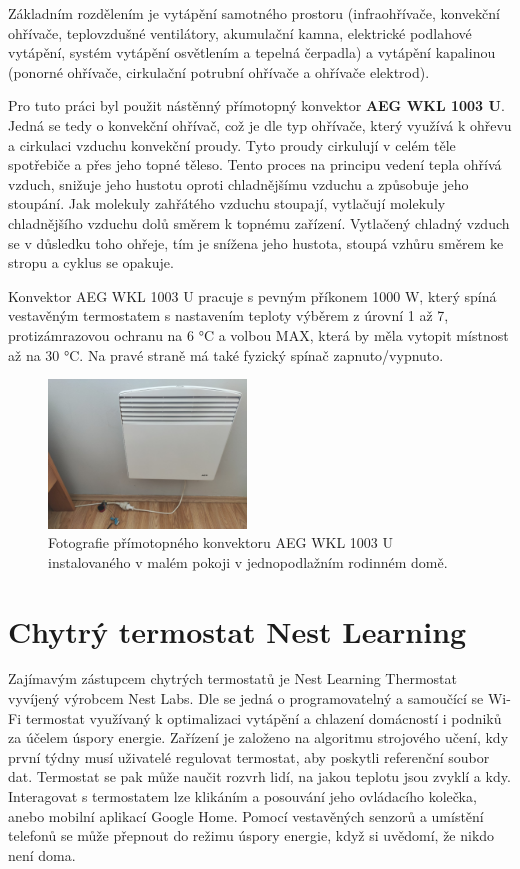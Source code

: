Základním rozdělením je vytápění samotného prostoru (infraohřívače, konvekční ohřívače, teplovzdušné ventilátory, akumulační kamna, elektrické podlahové vytápění, systém vytápění osvětlením a tepelná čerpadla) a vytápění kapalinou (ponorné ohřívače, cirkulační potrubní ohřívače a ohřívače elektrod).

Pro tuto práci byl použit nástěnný přímotopný konvektor \textbf{AEG WKL 1003 U}. Jedná se tedy o konvekční ohřívač, což je dle \cite{convectionHeater} typ ohřívače, který využívá k ohřevu a cirkulaci vzduchu konvekční proudy. Tyto proudy cirkulují v celém těle spotřebiče a přes jeho topné těleso. Tento proces na principu vedení tepla ohřívá vzduch, snižuje jeho hustotu oproti chladnějšímu vzduchu a způsobuje jeho stoupání. Jak molekuly zahřátého vzduchu stoupají, vytlačují molekuly chladnějšího vzduchu dolů směrem k topnému zařízení. Vytlačený chladný vzduch se v důsledku toho ohřeje, tím je snížena jeho hustota, stoupá vzhůru směrem ke stropu a cyklus se opakuje.

Konvektor AEG WKL 1003 U pracuje s pevným příkonem 1000 W, který spíná vestavěným termostatem s nastavením teploty výběrem z úrovní 1 až 7, protizámrazovou ochranu na 6 °C a volbou MAX, která by měla vytopit místnost až na 30 °C. Na pravé straně má také fyzický spínač zapnuto/vypnuto.

\begin{figure}[H]
\centering
\includegraphics[width=0.47\textwidth]{obrazky-figures/aeg-wkl-1003u.png}
\caption{Fotografie přímotopného konvektoru AEG WKL 1003 U instalovaného v malém pokoji v jednopodlažním rodinném domě.}
\end{figure}

\section{Chytrý termostat Nest Learning}
Zajímavým zástupcem chytrých termostatů je Nest Learning Thermostat vyvíjený výrobcem Nest Labs. Dle \cite{nest} se jedná o programovatelný a samoučící se Wi-Fi termostat využívaný k optimalizaci vytápění a chlazení domácností i podniků za účelem úspory energie. Zařízení je založeno na algoritmu strojového učení, kdy první týdny musí uživatelé regulovat termostat, aby poskytli referenční soubor dat. Termostat se pak může naučit rozvrh lidí, na jakou teplotu jsou zvyklí a kdy. Interagovat s termostatem lze klikáním a posouvání jeho ovládacího kolečka, anebo mobilní aplikací Google Home. Pomocí vestavěných senzorů a umístění telefonů se může přepnout do režimu úspory energie, když si uvědomí, že nikdo není doma.

